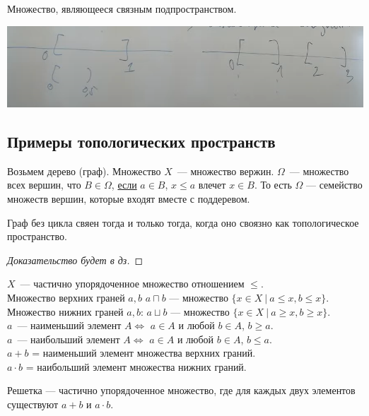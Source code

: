 \begin{definition}

    Множество, являющееся связным подпространством.
\end{definition}

\begin{center}
    \includegraphics[scale=0.6]{img/topology_connectivy}
\end{center}

\subsection{Примеры топологических пространств}
Возьмем дерево (граф). Множество $X$~--- множество вержин. $\Omega$~--- множество всех вершин, что
$B \in \Omega$, \underline{если} $a \in B$, $x \leqslant a$ влечет $x \in B$.
То есть $\Omega$ --- семейство множеств вершин, которые входят вместе с поддеревом.

\begin{theorem}
    Граф без цикла свяен тогда и только тогда, когда оно своязно как топологическое пространство.
\end{theorem}
\begin{proof}[Доказательство будет в дз]
\end{proof}

\begin{definition}[Решетки]
    $X$~--- частично упорядоченное множество отношением $\leqslant$.\\
    Множество верхних граней $a, b$ $a \sqcap b$ --- множество $\{ x \in X ~|~ a \leqslant x, b \leqslant x\}$.\\
    Множество нижних граней $a, b$: $a \sqcup b$ --- множество $\{ x \in X ~|~ a \geqslant x, b \geqslant x\}$.\\
    $a$~--- наименьший элемент $A \iff$ $a \in A$ и любой $b \in A$, $b \geqslant a$.\\
    $a$~--- наибольший элемент $A \iff$ $a \in A$ и любой $b \in A$, $b \leqslant a$.\\
    $a+b$ = наименьший элемент множества верхних граний.\\
    $a \cdot b$ = наибольший элемент множества нижних граний.

    Решетка --- частично упорядоченное множество, где для каждых двух элементов существуют $a+b$ и $a \cdot b$.
\end{definition}

